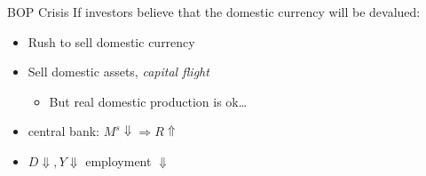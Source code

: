 \documentclass{beamer}
\begin{document}
\begin{frame}{BOP Crisis}
If investors believe that the domestic currency will be devalued:
\begin{itemize}
\item Rush to sell domestic currency
\item Sell domestic assets, \emph{capital flight}
\begin{itemize}
    \item But real domestic production is ok\dots
\end{itemize}
\item central bank: $M^{s}\Downarrow \Rightarrow R\Uparrow$
\item $D \Downarrow, Y \Downarrow$ employment $\Downarrow$
\end{itemize}
\end{frame}

\end{document}
